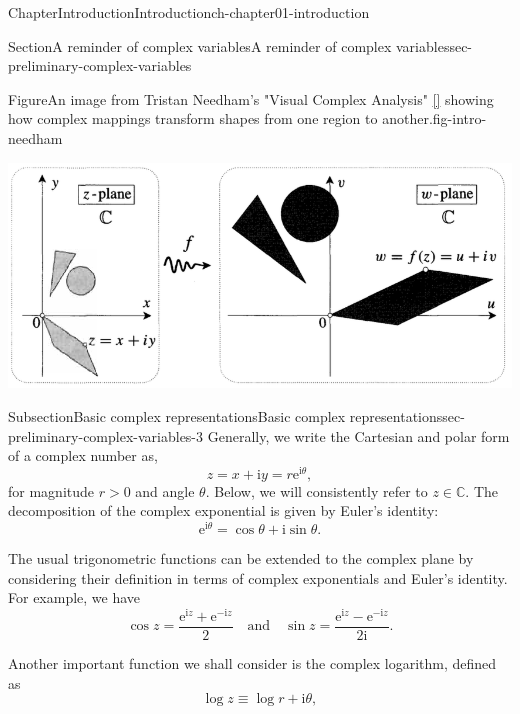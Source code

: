 \documentclass[oneside,10pt,]{book}
\newcommand{\xreffont}{\relax}
\numberwithin{equation}{section}
\newcommand{\e}{\mathrm{e}}
\newcommand{\im}{\mathrm{i}}
\begin{document}
\begin{chapterptx}{Chapter}{Introduction}{}{Introduction}{}{}{ch-chapter01-introduction}
\begin{sectionptx}{Section}{A reminder of complex variables}{}{A reminder of complex variables}{}{}{sec-preliminary-complex-variables}
\begin{introduction}{}
\begin{figureptx}{Figure}{An image from Tristan Needham's "Visual Complex Analysis" \hyperlink{ref-needham}{[{\xreffont 5}]} showing how complex mappings transform shapes from one region to another.}{fig-intro-needham}{}
\begin{image}{0.1}{0.8}{0.1}{}%
\includegraphics[width=\linewidth]{external/intro_needham.png}
\end{image}%
\tcblower
\end{figureptx}%
\end{introduction}%
%
%
\typeout{************************************************}
\typeout{************************************************}
%
\begin{subsectionptx}{Subsection}{Basic complex representations}{}{Basic complex representations}{}{}{sec-preliminary-complex-variables-3}
Generally, we write the Cartesian and polar form of a complex number as,%
\begin{equation*}
z = x + \im y = r\e^{\im\theta},
\end{equation*}
for magnitude \(r > 0\) and angle \(\theta\). Below, we will consistently refer to \(z\in\mathbb{C}\). The decomposition of the complex exponential is given by Euler's identity:%
\begin{equation}
\e^{\im\theta} = \cos \theta + \im \sin\theta.\label{eq-complex-euler}
\end{equation}
%
\par
The usual trigonometric functions can be extended to the complex plane by considering their definition in terms of complex exponentials and Euler's identity. For example, we have%
\begin{equation}
\cos z = \frac{\e^{\im z} + \e^{-\im z}}{2} \quad \text{and} \quad \sin z = \frac{\e^{\im z} - \e^{-\im z}}{2\im}.\label{eq-complex-cossin}
\end{equation}
%
\par
Another important function we shall consider is the complex logarithm, defined as%
\begin{equation}
\log z \equiv \log r + \im \theta,\label{eqn-intro-complex-log}
\end{equation}

\end{subsectionptx}
\end{sectionptx}
\end{chapterptx}
\end{document}
